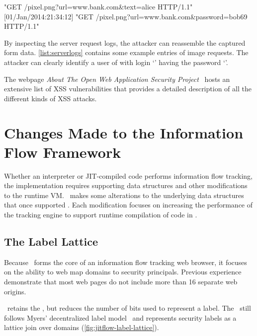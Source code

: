 \begin{jscode}
[01/Jan/2014:21:34:10] "GET /pixel.png?url=www.bank.com&text=alice HTTP/1.1"
[01/Jan/2014:21:34:12] "GET /pixel.png?url=www.bank.com&password=bob69 HTTP/1.1"
\end{jscode}

By inspecting the server request logs, the attacker can reassemble the captured form data.
\autoref{list:serverlogs} contains some example entries of image requests.
The attacker can clearly identify a user of  with login `' having the password `'.

The webpage \textit{About The Open Web Application Security Project}~\cite{xsscheatsheet} hosts an extensive list of XSS vulnerabilities that provides a detailed description of all the different kinds of XSS attacks.


\section{Changes Made to the Information Flow Framework}
\label{sec:jitflow-framework}

Whether an interpreter or JIT-compiled code performs information flow tracking, the implementation requires supporting data structures and other modifications to the runtime VM.
\JitFlow\ makes some alterations to the underlying data structures that once supported \FlowCore.
Each modification focuses on increasing the performance of the tracking engine to support runtime compilation of code in \JitFlow.

\subsection{The Label Lattice}

Because \JitFlow\ forms the core of an information flow tracking web browser, it focuses on the ability to web map domains to security principals.
Previous experience~\cite{kerschbaumer.etal+12, kerschbaumer.etal+13} demonstrate that most web pages do not include more than 16 separate web origins.

\JitFlow\ retains the \FlowLabelRegistry, but reduces the number of bits used to represent a label.
The \FlowLabelRegistry\ still follows Myers' decentralized label model~\cite{myers.liskov+00} and represents security labels as a lattice join over domains (\autoref{fig:jitflow-label-lattice}).

